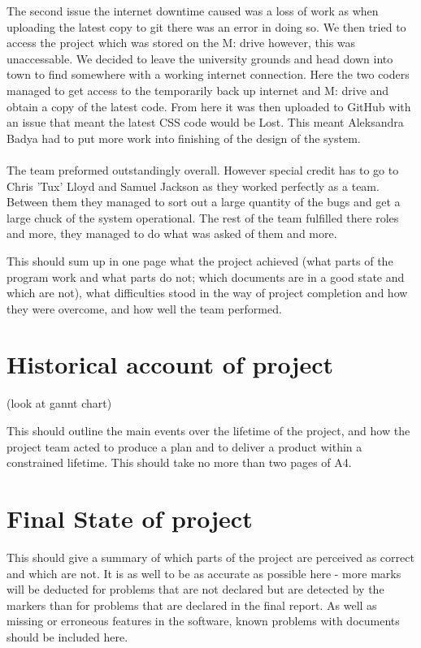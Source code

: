 \documentclass{project}
\begin{document}
The second issue the internet downtime caused was a loss of work as when uploading the latest copy to git there was an error in doing so. We then tried to access the project which was stored on the M: drive however, this was unaccessable. We decided to leave the university grounds and head down into town to find somewhere with a working internet connection. Here the two coders managed to get access to the temporarily back up internet and M: drive and obtain a copy of the latest code. From here it was then uploaded to GitHub with an issue that meant the latest CSS code would be Lost. This meant Aleksandra Badya had to put more work into finishing of the design of the system.  
\\
\\
The team preformed outstandingly overall. However special credit has to go to Chris 'Tux' Lloyd and Samuel Jackson as they worked perfectly as a team. Between them they managed to sort out a large quantity of the bugs and get a large chuck of the system operational. The rest of the team fulfilled there roles and more, they managed to do what was asked of them and more. 

This should sum up in one page what the project achieved (what parts of the program
work and what parts do not; which documents are in a good state and which are not), what difficulties stood in
the way of project completion and how they were overcome, and how well the team performed.

\section{Historical account of project}
(look at gannt chart)

This should outline the main events over the lifetime of the project, and how
the project team acted to produce a plan and to deliver a product within a constrained lifetime. This should take
no more than two pages of A4.

\section{Final State of project}

This should give a summary of which parts of the project are perceived as correct and
which are not. It is as well to be as accurate as possible here - more marks will be deducted for problems that are
not declared but are detected by the markers than for problems that are declared in the final report. As well as
missing or erroneous features in the software, known problems with documents should be included here.
\end{document}
